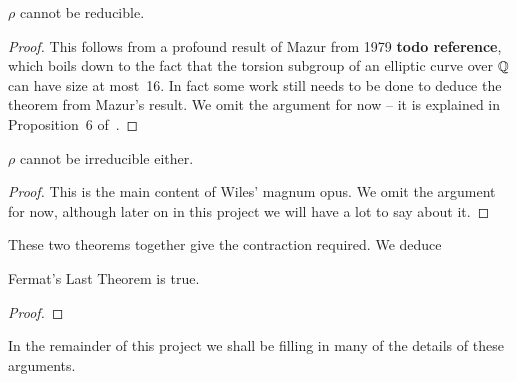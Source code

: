 \begin{theorem}[Mazur]\label{mazur_frey} $\rho$ cannot be reducible.\end{theorem}
\begin{proof} This follows from a profound result of Mazur from 1979 {\bf todo reference}, which boils down to the fact that the torsion subgroup of an elliptic curve over $\mathbb{Q}$ can have size at most~16. In fact some work still needs to be done to deduce the theorem from Mazur's result. We omit the argument for now -- it is explained in Proposition~6 of~\cite{serreconj}.
\end{proof}

\begin{theorem}\label{wiles_frey} $\rho$ cannot be irreducible either.\end{theorem}
\begin{proof} This is the main content of Wiles' magnum opus. We omit the argument for now, although later on in this project we will have a lot to say about it.
  \end{proof}

These two theorems together give the contraction required. We deduce

\begin{corollary}\label{FLT} Fermat's Last Theorem is true.\end{corollary}
\begin{proof}\end{proof}

In the remainder of this project we shall be filling in many of the details of these arguments.
